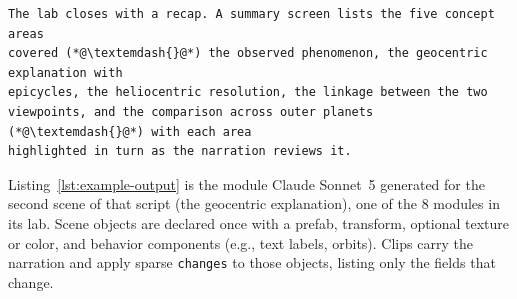 \begin{lstlisting}[style=arlemlisting, caption={Complete Script-level JSON Lab input for \emph{Apparent Retrograde Motion}: system prompt, then user prompt.}, label={lst:example-prompt}]
The lab closes with a recap. A summary screen lists the five concept areas
covered (*@\textemdash{}@*) the observed phenomenon, the geocentric explanation with
epicycles, the heliocentric resolution, the linkage between the two
viewpoints, and the comparison across outer planets (*@\textemdash{}@*) with each area
highlighted in turn as the narration reviews it.
\end{lstlisting}

Listing~\ref{lst:example-output} is the module Claude Sonnet~5 generated
for the second scene of that script (the geocentric explanation), one of the
8 modules in its lab. Scene objects are declared once with a
prefab, transform, optional texture or color, and behavior components
(e.g., text labels, orbits). Clips carry the narration and apply sparse
\texttt{changes} to those objects, listing only the fields that change.

